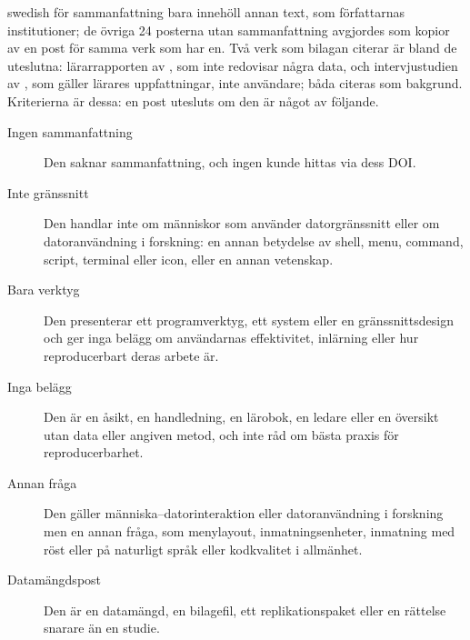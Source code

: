 \begin{onlyin}{swedish}
för sammanfattning bara innehöll annan text, som författarnas
institutioner; de övriga 24 posterna utan sammanfattning avgjordes som
kopior av en post för samma verk som har en.  Två verk som bilagan citerar
är bland de uteslutna: lärarrapporten av \textcite{Kendon2016Unix}, som
inte redovisar några data, och intervjustudien av \textcite{Doyle2007Why},
som gäller lärares uppfattningar, inte användare; båda citeras som
bakgrund.
Kriterierna är dessa: en post
utesluts om den är något av följande.
\begin{description}
  \item[Ingen sammanfattning] Den saknar sammanfattning, och ingen
    kunde hittas via dess DOI.
  \item[Inte gränssnitt] Den handlar inte om människor som använder
    datorgränssnitt eller om datoranvändning i forskning: en annan
    betydelse av shell, menu, command, script, terminal eller icon,
    eller en annan vetenskap.
  \item[Bara verktyg] Den presenterar ett programverktyg, ett system
    eller en gränssnittsdesign och ger inga belägg om användarnas
    effektivitet, inlärning eller hur reproducerbart deras arbete är.
  \item[Inga belägg] Den är en åsikt, en handledning, en lärobok, en
    ledare eller en översikt utan data eller angiven metod, och inte råd
    om bästa praxis för reproducerbarhet.
  \item[Annan fråga] Den gäller människa--datorinteraktion eller
    datoranvändning i forskning men en annan fråga, som menylayout,
    inmatningsenheter, inmatning med röst eller på naturligt språk eller
    kodkvalitet i allmänhet.
  \item[Datamängdspost] Den är en datamängd, en bilagefil, ett
    replikationspaket eller en rättelse snarare än en studie.
\end{description}
\end{onlyin}

